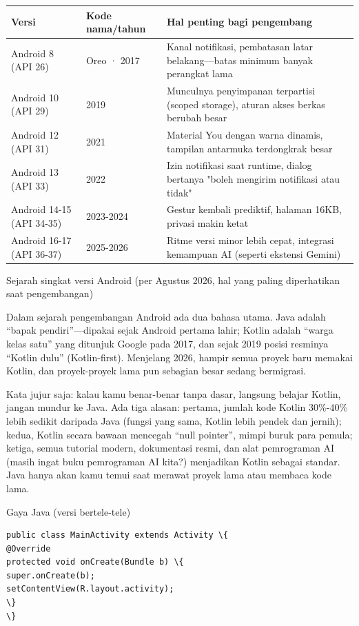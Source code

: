 \begin{center}
\begin{tabularx}{\linewidth}{|X|X|X|}
\hline
\textbf{Versi} & \textbf{Kode nama/tahun} & \textbf{Hal penting bagi pengembang} \tabularnewline
\hline
Android 8 (API 26) & Oreo · 2017 & Kanal notifikasi, pembatasan latar belakang—batas minimum banyak perangkat lama \tabularnewline
Android 10 (API 29) & 2019 & Munculnya penyimpanan terpartisi (scoped storage), aturan akses berkas berubah besar \tabularnewline
Android 12 (API 31) & 2021 & Material You dengan warna dinamis, tampilan antarmuka terdongkrak besar \tabularnewline
Android 13 (API 33) & 2022 & Izin notifikasi saat runtime, dialog bertanya "boleh mengirim notifikasi atau tidak" \tabularnewline
Android 14-15 (API 34-35) & 2023-2024 & Gestur kembali prediktif, halaman 16KB, privasi makin ketat \tabularnewline
Android 16-17 (API 36-37) & 2025-2026 & Ritme versi minor lebih cepat, integrasi kemampuan AI (seperti ekstensi Gemini) \tabularnewline
\hline
\end{tabularx}
\end{center}

\begin{center}\small\color{gray}Sejarah singkat versi Android (per Agustus 2026, hal yang paling diperhatikan saat pengembangan)\end{center}


Dalam sejarah pengembangan Android ada dua bahasa utama. Java adalah “bapak pendiri”—dipakai sejak Android pertama lahir; Kotlin adalah “warga kelas satu” yang ditunjuk Google pada 2017, dan sejak 2019 posisi resminya “Kotlin dulu” (Kotlin-first). Menjelang 2026, hampir semua proyek baru memakai Kotlin, dan proyek-proyek lama pun sebagian besar sedang bermigrasi.

Kata jujur saja: kalau kamu benar-benar tanpa dasar, langsung belajar Kotlin, jangan mundur ke Java. Ada tiga alasan: pertama, jumlah kode Kotlin 30\%-40\% lebih sedikit daripada Java (fungsi yang sama, Kotlin lebih pendek dan jernih); kedua, Kotlin secara bawaan mencegah “null pointer”, mimpi buruk para pemula; ketiga, semua tutorial modern, dokumentasi resmi, dan alat pemrograman AI (masih ingat buku pemrograman AI kita?) menjadikan Kotlin sebagai standar. Java hanya akan kamu temui saat merawat proyek lama atau membaca kode lama.

Gaya Java (versi bertele-tele)

\begin{lstlisting}
public class MainActivity extends Activity \{
@Override
protected void onCreate(Bundle b) \{
super.onCreate(b);
setContentView(R.layout.activity);
\}
\}
\end{lstlisting}


